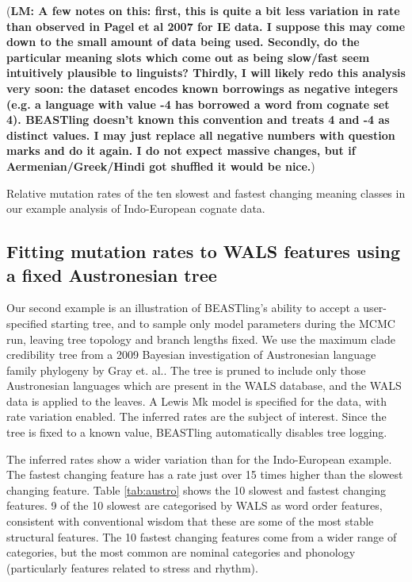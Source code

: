 \documentclass[twocolumn,10pt]{scrartcl}
\begin{document}
(\textbf{LM: A few notes on this: first, this is quite a bit less variation in rate than observed in Pagel et al 2007 for IE data.  I suppose this may come down to the small amount of data being used.  Secondly, do the particular meaning slots which come out as being slow/fast seem intuitively plausible to linguists?  Thirdly, I will likely redo this analysis very soon: the dataset encodes known borrowings as negative integers (e.g. a language with value -4 has borrowed a word from cognate set 4).  BEASTling doesn't known this convention and treats 4 and -4 as distinct values.  I may just replace all negative numbers with question marks and do it again.  I do  not expect massive changes, but if Aermenian/Greek/Hindi got shuffled it would be nice.})
\begin{table}[t]
	\begin{center}
		
	\end{center}
	\caption{Relative mutation rates of the ten slowest and fastest changing meaning classes in our example analysis of Indo-European cognate data.}
\label{tab:ie}
\end{table}

\subsection{Fitting mutation rates to WALS features using a fixed Austronesian tree}

Our second example is an illustration of BEASTling's ability to accept a user-specified starting tree, and to sample only model parameters during the MCMC run, leaving tree topology and branch lengths fixed.  We use the maximum clade credibility tree from a 2009 Bayesian investigation of Austronesian language family phylogeny by Gray et. al.\cite{Gray2009}.  The tree is pruned to include only those Austronesian languages which are present in the WALS database, and the WALS data is applied to the leaves.  A Lewis Mk model is specified for the data, with rate variation enabled.  The inferred rates are the subject of interest.  Since the tree is fixed to a known value, BEASTling automatically disables tree logging.

The inferred rates show a wider variation than for the Indo-European example.  The fastest changing feature has a rate just over 15 times higher than the slowest changing feature.  Table \ref{tab:austro} shows the 10 slowest and fastest changing features.  9 of the 10 slowest are categorised by WALS as word order features, consistent with conventional wisdom that these are some of the most stable structural features.  The 10 fastest changing features come from a wider range of categories, but the most common are nominal categories and phonology (particularly features related to stress and rhythm).
\end{document}
